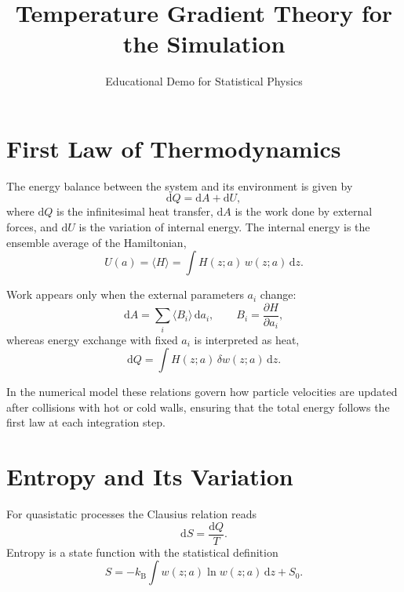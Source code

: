 \documentclass[12pt,a4paper]{article}
\title{Temperature Gradient Theory for the Simulation}
\author{Educational Demo for Statistical Physics}
\date{}
\begin{document}
\maketitle

\tableofcontents
\newpage

\section{First Law of Thermodynamics}
The energy balance between the system and its environment is given by
\begin{equation}
    \mathrm{d}Q = \mathrm{d}A + \mathrm{d}U,
\end{equation}
where $\mathrm{d}Q$ is the infinitesimal heat transfer, $\mathrm{d}A$ is the work done by external forces, and $\mathrm{d}U$ is the variation of internal energy. The internal energy is the ensemble average of the Hamiltonian,
\begin{equation}
    U(a) = \langle H \rangle = \int H(z; a)\, w(z; a)\, \mathrm{d}z.
\end{equation}

Work appears only when the external parameters $a_i$ change:
\begin{equation}
    \mathrm{d}A = \sum_i \langle B_i \rangle\, \mathrm{d}a_i, \qquad B_i = \frac{\partial H}{\partial a_i},
\end{equation}
whereas energy exchange with fixed $a_i$ is interpreted as heat,
\begin{equation}
    \mathrm{d}Q = \int H(z; a)\, \delta w(z; a)\, \mathrm{d}z.
\end{equation}

In the numerical model these relations govern how particle velocities are updated after collisions with hot or cold walls, ensuring that the total energy follows the first law at each integration step.

\section{Entropy and Its Variation}
For quasistatic processes the Clausius relation reads
\begin{equation}
    \mathrm{d}S = \frac{\mathrm{d}Q}{T}.
\end{equation}
Entropy is a state function with the statistical definition
\begin{equation}
    S = -k_{\mathrm{B}} \int w(z; a) \ln w(z; a)\, \mathrm{d}z + S_0.
\end{equation}
\end{document}
